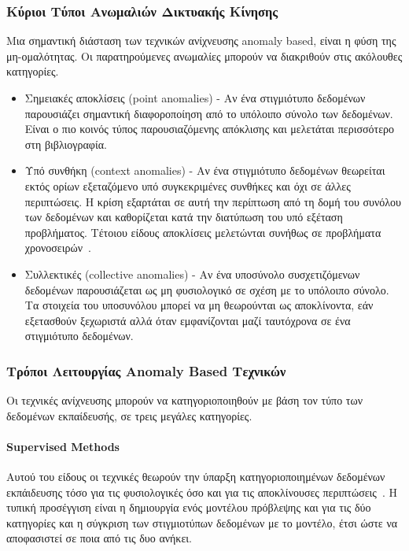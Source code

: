 \documentclass[12pt]{report}
\begin{document}
\subsubsection{Κύριοι Τύποι Ανωμαλιών Δικτυακής Κίνησης}
Μια σημαντική διάσταση των τεχνικών ανίχνευσης \textlatin{anomaly based}, είναι η φύση της μη-ομαλότητας. Οι παρατηρούμενες ανωμαλίες μπορούν να διακριθούν στις ακόλουθες κατηγορίες.
\begin{itemize}
	\item Σημειακές αποκλίσεις (\textlatin{point anomalies}) - Αν ένα στιγμιότυπο δεδομένων παρουσιάζει σημαντική διαφοροποίηση από το υπόλοιπο σύνολο των δεδομένων. Είναι ο πιο κοινός τύπος παρουσιαζόμενης απόκλισης και μελετάται περισσότερο στη βιβλιογραφία.
	\item Υπό συνθήκη (\textlatin{context anomalies}) - Αν ένα στιγμιότυπο δεδομένων θεωρείται εκτός ορίων εξεταζόμενο υπό συγκεκριμένες συνθήκες και όχι σε άλλες περιπτώσεις. Η κρίση εξαρτάται σε αυτή την περίπτωση από τη δομή του συνόλου των δεδομένων και καθορίζεται κατά την διατύπωση του υπό εξέταση προβλήματος. Τέτοιου είδους αποκλίσεις μελετώνται συνήθως σε προβλήματα χρονοσειρών~\cite{paper:14}.
	\item Συλλεκτικές (\textlatin{collective anomalies}) - Αν ένα υποσύνολο συσχετιζόμενων δεδομένων παρουσιάζεται ως μη φυσιολογικό σε σχέση με το υπόλοιπο σύνολο. Τα στοιχεία του υποσυνόλου μπορεί να μη θεωρούνται ως αποκλίνοντα, εάν εξετασθούν ξεχωριστά αλλά όταν εμφανίζονται μαζί ταυτόχρονα σε ένα στιγμιότυπο δεδομένων.
\end{itemize}

\subsubsection{Τρόποι Λειτουργίας \textlatin{Anomaly Based} Τεχνικών}
Οι τεχνικές ανίχνευσης μπορούν να κατηγοριοποιηθούν με βάση τον τύπο των δεδομένων εκπαίδευσής, σε τρεις μεγάλες κατηγορίες.
\paragraph{\textlatin{Supervised Methods}} Αυτού του είδους οι τεχνικές θεωρούν την ύπαρξη κατηγοριοποιημένων δεδομένων εκπάιδευσης τόσο για τις φυσιολογικές όσο και για τις αποκλίνουσες περιπτώσεις~\cite{paper:14}. Η τυπική προσέγγιση είναι η δημιουργία ενός μοντέλου πρόβλεψης και για τις δύο κατηγορίες και η σύγκριση των στιγμιοτύπων δεδομένων με το μοντέλο, έτσι ώστε να αποφασιστεί σε ποια από τις δυο ανήκει.
\end{document}

